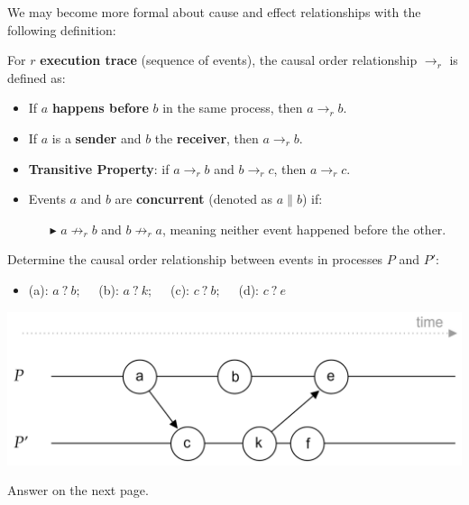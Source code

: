\noindent
We may become more formal about cause and effect relationships with the following definition:
\begin{Def}

    For $r$ \textbf{execution trace} (sequence of events), the causal order relationship $\rightarrow_r$ is defined as:

    \begin{itemize}
        \item If $a$ \textbf{happens before} $b$ in the same process, then $a \rightarrow_r b$.
        \item If $a$ is a \textbf{sender} and $b$ the \textbf{receiver}, then $a \rightarrow_r b$.
        \item \textbf{Transitive Property}: if $a \rightarrow_r b$ and $b \rightarrow_r c$, then $a \rightarrow_r c$.
        \item Events $a$ and $b$ are \textbf{concurrent} (denoted as $a \parallel b$) if:
            \begin{itemize}
                \item[$\blacktriangleright$] $a \not\rightarrow_r b$ and $b \not\rightarrow_r a$, meaning neither event happened before the other.
            \end{itemize}
    \end{itemize}
\end{Def}
\begin{Example}

    \label{ex:causal}
    Determine the causal order relationship between events in processes $P$ and $P'$:

    \begin{itemize}
        \item (a): $a\ ?\ b;\quad $ (b): $a\ ?\ k;\quad$ (c): $ c\ ?\ b;\quad$ (d): $ c\ ?\ e$
    \end{itemize}

    

    \hspace{4em}
    \includegraphics[width=.7\textwidth]{./Sections/time/causal.png}
        
    \vspace{1em}
    \noindent
    Answer on the next page.
\end{Example}
\newpage 

